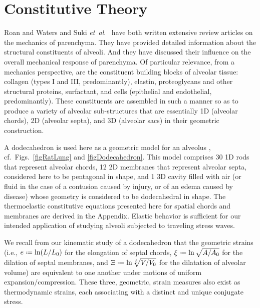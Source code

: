 \section{Constitutive Theory}
\label{partConstitutive}

Roan and Waters \cite{RoanWaters11} and Suki \textit{et~al}.\ \cite{Sukietal05,Sukietal11} have both written extensive review articles on the mechanics of parenchyma.  They have provided detailed information about the structural constituents of alveoli.  And they have discussed their influence on the overall mechanical response of parenchyma.  Of particular relevance, from a mechanics perspective, are the constituent building blocks of alveolar tissue: collagen (types I and III, predominantly), elastin, proteoglycans and other structural proteins, surfactant, and cells (epithelial and endothelial, predominantly).  These constituents are assembled in such a manner so as to produce a variety of alveolar sub-structures that are essentially 1D (alveolar chords), 2D (alveolar septa), and 3D (alveolar sacs) in their geometric construction.

A dodecahedron is used here as a geometric model for an alveolus \cite{FrankusLee74}, cf.\ Figs.~\ref{figRatLung} and \ref{figDodecahedron}.  This model comprises 30 1D rods that represent alveolar chords, 12 2D membranes that represent alveolar septa, considered here to be pentagonal in shape, and 1 3D cavity filled with air (or fluid in the case of a contusion caused by injury, or of an edema caused by disease) whose geometry is considered to be dodecahedral in shape.  The thermo\-elastic constitutive equations presented here for spatial chords and membranes are derived in the Appendix.  Elastic behavior is sufficient for our intended application of studying alveoli subjected to traveling stress waves.

We recall from our kinematic study of a dodecahedron that the geometric strains (i.e., $e \defeq \ln ( L / L_0 )$ for the elongation of septal chords, $\xi \defeq \ln \sqrt{A / A_0}$ for the dilation of septal membranes, and $\Xi \defeq \ln \sqrt[3]{V / V_0}$ for the dilatation of alveolar volume) are equivalent to one another under motions of uniform expansion\slash compression.  These three, geometric, strain measures also exist as thermo\-dynamic strains, each associating with a distinct and unique conjugate stress. \cite{Freed17,FreedZamani19}

